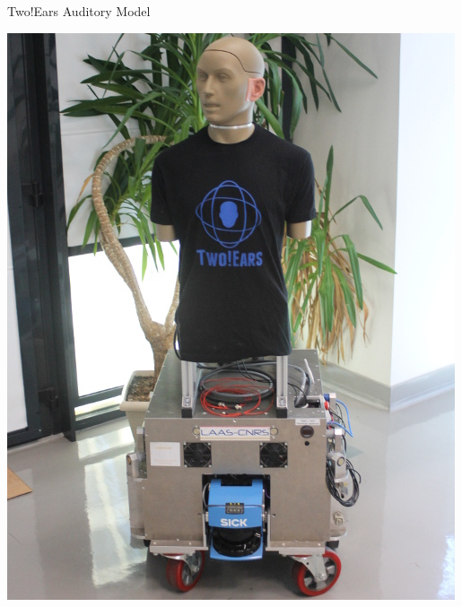 \documentclass{beamer}
\begin{document}
\begin{frame}{Two!Ears Auditory Model}
\begin{minipage}[b]{0.56\columnwidth}
        \centering
        \includegraphics[width=.575\textwidth]{fig/robot}

    \end{minipage}

\end{frame}
\end{document}
